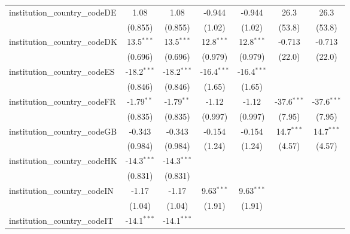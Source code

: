\begin{tabular}{lcccccc}
   institution\_country\_codeDE          & 1.08          & 1.08          & -0.944        & -0.944        & 26.3          & 26.3\\   
                                         & (0.855)       & (0.855)       & (1.02)        & (1.02)        & (53.8)        & (53.8)\\   
   institution\_country\_codeDK          & 13.5$^{***}$  & 13.5$^{***}$  & 12.8$^{***}$  & 12.8$^{***}$  & -0.713        & -0.713\\   
                                         & (0.696)       & (0.696)       & (0.979)       & (0.979)       & (22.0)        & (22.0)\\   
   institution\_country\_codeES          & -18.2$^{***}$ & -18.2$^{***}$ & -16.4$^{***}$ & -16.4$^{***}$ &               &   \\   
                                         & (0.846)       & (0.846)       & (1.65)        & (1.65)        &               &   \\   
   institution\_country\_codeFR          & -1.79$^{**}$  & -1.79$^{**}$  & -1.12         & -1.12         & -37.6$^{***}$ & -37.6$^{***}$\\   
                                         & (0.835)       & (0.835)       & (0.997)       & (0.997)       & (7.95)        & (7.95)\\   
   institution\_country\_codeGB          & -0.343        & -0.343        & -0.154        & -0.154        & 14.7$^{***}$  & 14.7$^{***}$\\   
                                         & (0.984)       & (0.984)       & (1.24)        & (1.24)        & (4.57)        & (4.57)\\   
   institution\_country\_codeHK          & -14.3$^{***}$ & -14.3$^{***}$ &               &               &               &   \\   
                                         & (0.831)       & (0.831)       &               &               &               &   \\   
   institution\_country\_codeIN          & -1.17         & -1.17         & 9.63$^{***}$  & 9.63$^{***}$  &               &   \\   
                                         & (1.04)        & (1.04)        & (1.91)        & (1.91)        &               &   \\   
   institution\_country\_codeIT          & -14.1$^{***}$ & -14.1$^{***}$ &               &               &               &   \\   

\end{tabular}
